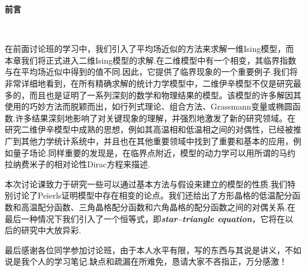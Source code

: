 \documentclass[a4paper]{book}
\newcommand{\xtjc}[1]{\textbf{\textit{#1}}}
\begin{document}

\pagestyle{plain}
\centerline{\LARGE{\textbf{前言}}}\par 
~\par
在前面讨论班的学习中，我们引入了平均场近似的方法来求解一维Ising模型，而本章我们将正式进入二维Ising模型的求解.在二维模型中有一个相变，其临界指数与在平均场近似中得到的值不同.因此，它提供了临界现象的一个重要例子.我们将非常详细地看到，在所有精确求解的统计力学模型中，二维伊辛模型不仅是研究最多的，而且也是证明了一系列深刻的数学和物理结果的模型。该模型的许多解因其使用的巧妙方法而脱颖而出，如行列式理论、组合方法、Grassmann变量或椭圆函数.许多结果深刻地影响了对关键现象的理解，并强烈地激发了新的研究领域。在研究二维伊辛模型中成熟的思想，例如其高温相和低温相之间的对偶性，已经被推广到其他力学统计系统中，并且也在其他重要领域中找到了重要和基本的应用，例如量子场论.同样重要的发现是，在临界点附近，模型的动力学可以用所谓的马约拉纳费米子的相对论性Dirac方程来描述.\par 
本次讨论课致力于研究一些可以通过基本方法与假设来建立的模型的性质.我们特别讨论了Peierls证明模型中存在相变的论点。我们还给出了方形晶格的低温配分函数和高温配分函数、三角晶格配分函数和六角晶格的配分函数之间的对偶关系.在最后一种情况下我们引入了一个恒等式，即\xtjc{star–triangle equation}，它将在以后的研究中大放异彩.\par 
最后感谢各位同学参加讨论班，由于本人水平有限，写的东西与其说是讲义，不如说是我个人的学习笔记.缺点和疏漏在所难免，恳请大家不吝指正，万分感激！
\newpage
\tableofcontents%


\end{document}

